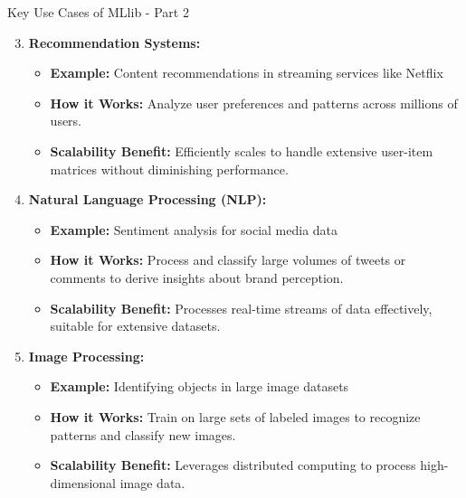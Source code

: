 \documentclass[aspectratio=169]{beamer}
\begin{document}
\begin{frame}[fragile]{Key Use Cases of MLlib - Part 2}
    \begin{enumerate}
        \setcounter{enumi}{2}
        \item \textbf{Recommendation Systems:}
            \begin{itemize}
                \item \textbf{Example:} Content recommendations in streaming services like Netflix
                \item \textbf{How it Works:} Analyze user preferences and patterns across millions of users.
                \item \textbf{Scalability Benefit:} Efficiently scales to handle extensive user-item matrices without diminishing performance.
            \end{itemize}
        \item \textbf{Natural Language Processing (NLP):}
            \begin{itemize}
                \item \textbf{Example:} Sentiment analysis for social media data
                \item \textbf{How it Works:} Process and classify large volumes of tweets or comments to derive insights about brand perception.
                \item \textbf{Scalability Benefit:} Processes real-time streams of data effectively, suitable for extensive datasets.
            \end{itemize}
        \item \textbf{Image Processing:}
            \begin{itemize}
                \item \textbf{Example:} Identifying objects in large image datasets
                \item \textbf{How it Works:} Train on large sets of labeled images to recognize patterns and classify new images.
                \item \textbf{Scalability Benefit:} Leverages distributed computing to process high-dimensional image data.
            \end{itemize}
    \end{enumerate}
\end{frame}
\end{document}
